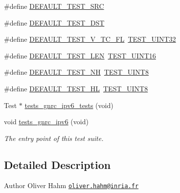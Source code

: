 \begin{DoxyCompactItemize}
\item 
\#define \hyperlink{tests-gnrc__ipv6_8c_aa4c51543e0d0fa390349bc4655d74639}{D\+E\+F\+A\+U\+L\+T\+\_\+\+T\+E\+S\+T\+\_\+\+S\+RC}
\item 
\#define \hyperlink{tests-gnrc__ipv6_8c_af036f8b203b4e892d3552d3ba77849d0}{D\+E\+F\+A\+U\+L\+T\+\_\+\+T\+E\+S\+T\+\_\+\+D\+ST}
\item 
\#define \hyperlink{tests-gnrc__ipv6_8c_afc59d6303a14556e6e830a0ae9e94360}{D\+E\+F\+A\+U\+L\+T\+\_\+\+T\+E\+S\+T\+\_\+\+V\+\_\+\+T\+C\+\_\+\+FL}~\hyperlink{unittests-constants_8h_a7504d2f34f62312f47d31a9a8c385961}{T\+E\+S\+T\+\_\+\+U\+I\+N\+T32}
\item 
\#define \hyperlink{tests-gnrc__ipv6_8c_abbad4b86c54e96f887927271457e3715}{D\+E\+F\+A\+U\+L\+T\+\_\+\+T\+E\+S\+T\+\_\+\+L\+EN}~\hyperlink{unittests-constants_8h_ada84310dd4f52d94096d5baed5eb75e1}{T\+E\+S\+T\+\_\+\+U\+I\+N\+T16}
\item 
\#define \hyperlink{tests-gnrc__ipv6_8c_abf4230d2671023b9ec71d0dd78240bcb}{D\+E\+F\+A\+U\+L\+T\+\_\+\+T\+E\+S\+T\+\_\+\+NH}~\hyperlink{unittests-constants_8h_a9a493e3e4fe69d0b8c338869ebcadbc4}{T\+E\+S\+T\+\_\+\+U\+I\+N\+T8}
\item 
\#define \hyperlink{tests-gnrc__ipv6_8c_a5a27e8c156c6c9d193356c44078c2fec}{D\+E\+F\+A\+U\+L\+T\+\_\+\+T\+E\+S\+T\+\_\+\+HL}~\hyperlink{unittests-constants_8h_a9a493e3e4fe69d0b8c338869ebcadbc4}{T\+E\+S\+T\+\_\+\+U\+I\+N\+T8}
\item 
Test $\ast$ \hyperlink{tests-gnrc__ipv6_8c_aa6f48b3c3bc37d990284a77ede0a3d72}{tests\+\_\+gnrc\+\_\+ipv6\+\_\+tests} (void)
\item 
void \hyperlink{group__unittests_gaec5ea3d48a03bd5f1f2194f33ce38010}{tests\+\_\+gnrc\+\_\+ipv6} (void)
\begin{DoxyCompactList}\small\item\em The entry point of this test suite. \end{DoxyCompactList}\end{DoxyCompactItemize}


\subsection{Detailed Description}
\begin{DoxyAuthor}{Author}
Oliver Hahm \href{mailto:oliver.hahm@inria.fr}{\tt oliver.\+hahm@inria.\+fr} 
\end{DoxyAuthor}


